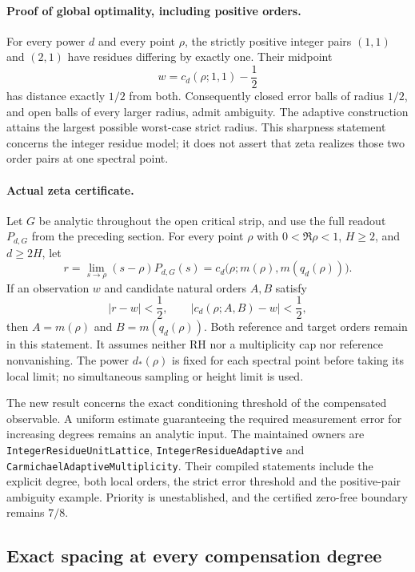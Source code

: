 \paragraph{Proof of global optimality, including positive orders.}
For every power \(d\) and every point \(\rho\), the strictly positive
integer pairs \((1,1)\) and \((2,1)\) have residues differing by exactly
one. Their midpoint
\[
 w=c_d(\rho;1,1)-\frac12
\]
has distance exactly \(1/2\) from both. Consequently closed error balls
of radius \(1/2\), and open balls of every larger radius, admit
ambiguity. The adaptive construction attains the largest possible
worst-case strict radius. This sharpness statement concerns the integer
residue model; it does not assert that zeta realizes those two order
pairs at one spectral point.

\paragraph{Actual zeta certificate.}
Let \(G\) be analytic throughout the open critical strip, and use the full
readout \(P_{d,G}\) from the preceding section. For every point \(\rho\)
with \(0<\Re\rho<1\), \(H\ge2\), and \(d\ge2H\), let
\[
 r=\lim_{s\to\rho}(s-\rho)P_{d,G}(s)
   =c_d\bigl(\rho;m(\rho),m(q_d(\rho))\bigr).
\]
If an observation \(w\) and candidate natural orders \(A,B\) satisfy
\[
 |r-w|<\frac12,\qquad |c_d(\rho;A,B)-w|<\frac12,
\]
then \(A=m(\rho)\) and \(B=m(q_d(\rho))\).
Both reference and target orders remain in this statement. It assumes
neither RH nor a multiplicity cap nor reference nonvanishing.
The power \(d_*(\rho)\) is fixed for each spectral point before taking
its local limit; no simultaneous sampling or height limit is used.

The new result concerns the exact conditioning threshold of the
compensated observable. A uniform estimate guaranteeing the required
measurement error for increasing degrees remains an analytic input.
The maintained owners are \texttt{IntegerResidueUnitLattice},
\texttt{IntegerResidueAdaptive} and
\texttt{CarmichaelAdaptiveMultiplicity}. Their compiled statements
include the explicit degree, both local orders, the strict error
threshold and the positive-pair ambiguity example.
Priority is unestablished, and the certified zero-free boundary remains \(7/8\).

\subsection{Exact spacing at every compensation degree}
\label{sec:exact-strip-residue-spacing}

